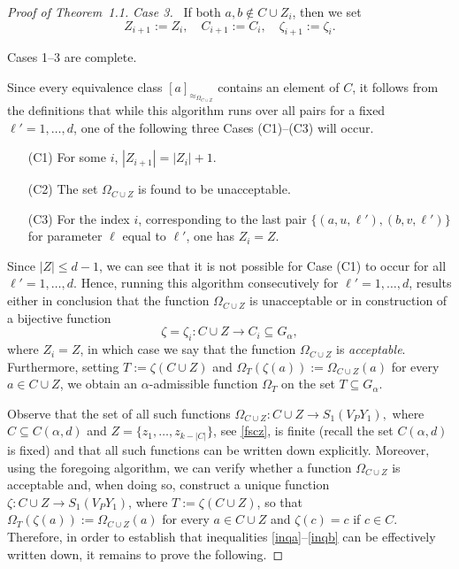 \documentclass[10pt, reqno]{amsart}
\numberwithin{equation}{section}
\begin{document}
\begin{proof}[Proof of Theorem~1.1]
  {\em  Case 3.} \  If both $a, b \not\in C \cup Z_i$, then we  set
$$
Z_{i+1} := Z_{i}   ,  \quad    C_{i+1} := C_{i}  ,  \quad   \zeta_{i+1} := \zeta_{i} .
$$

Cases 1--3 are complete.
\medskip

Since every equivalence class $[a]_{\approx_{{{\Omega}}_{C \cup Z}}}$ contains an element
of $C$,  it follows from the definitions that while this algorithm runs over all pairs for a fixed $\ell' = 1, \dots, d$, one of the following three Cases (C1)--(C3) will occur.

\begin{enumerate}
\item[(C1)] For some $i$,  $|Z_{i+1}| = |Z_{i}|+1$.

\item[(C2)] The set  ${{\Omega}}_{C \cup Z}$ is found to be  unacceptable.

\item[(C3)] For the index $i$, corresponding to the last pair $\{ (a, u, \ell'),  (b, v, \ell') \}$  for parameter $\ell$ equal to $\ell'$,  one has  $Z_{i} = Z$.
\end{enumerate}

Since $|Z| \le d-1$, we can see that it is not possible for Case (C1) to occur for all
$\ell' = 1, \dots, d$. Hence, running this algorithm
consecutively for $\ell' = 1, \dots, d$, results either in conclusion that the function   ${{\Omega}}_{C \cup Z}$ is  unacceptable or in construction of a bijective function
$$
\zeta = \zeta_{i} : C \cup Z \to  C_i \subseteq G_{\alpha} ,
$$
where $Z_{i} =Z$, in which case we say that the function ${{\Omega}}_{C \cup Z}$ is  {\em acceptable}.
Furthermore, setting $T := \zeta(C \cup Z)$ and ${{\Omega}}_T( \zeta(a) ) := {{\Omega}}_{C \cup Z}(a)$ for every $a \in C \cup Z$, we obtain an ${\alpha}$-admissible function ${{\Omega}}_T$ on the set $T \subseteq G_{\alpha}$.

Observe that the set of all such   functions
$
{{\Omega}}_{C \cup Z} :  C \cup Z \to S_1(V_PY_1) ,
$
where $C \subseteq C({\alpha}, d)$  and  $Z = \{ z_1, \dots, z_{k-|C|} \}$, see  \eqref{fscz},  is finite  (recall the set $C({\alpha}, d)$ is fixed) and that all such  functions   can be written down explicitly. Moreover, using the foregoing algorithm, we can verify whether a function ${{\Omega}}_{C \cup Z}$ is acceptable and, when doing so, construct a unique function
$\zeta : C \cup Z \to S_1(V_PY_1)$, where $T := \zeta( C \cup Z )$,
so that ${{\Omega}}_T( \zeta(a) ) := {{\Omega}}_{C \cup Z}(a)$ for every $a \in C \cup Z$ and $\zeta(c) = c$ if $c \in C$. Therefore, in order to establish that inequalities \eqref{inqa}--\eqref{inqb} can be effectively written down, it remains to prove the following.


\end{proof}
\end{document}
